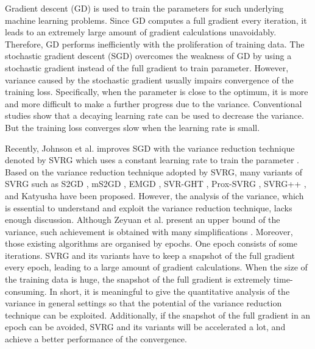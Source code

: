 \documentclass[letterpaper]{article}
\begin{document}
Gradient descent (GD) is used to train the parameters for such underlying machine learning problems. Since GD computes a full gradient every iteration, it leads to an extremely large amount of gradient calculations unavoidably.  Therefore, GD  performs inefficiently with the proliferation of training data. The stochastic gradient descent (SGD) overcomes the weakness of GD by using a stochastic gradient instead of the full gradient to train parameter. However, variance caused by the stochastic gradient usually impairs convergence of the training loss. Specifically, when the parameter is close to the optimum, it is more and more difficult to make a further progress  due to the variance. Conventional studies show that a decaying learning rate can be used to decrease the variance. But the training loss converges slow when the learning rate is small. 

Recently, Johnson et al. improves SGD with the variance reduction technique denoted by SVRG which uses a constant learning rate to train the parameter \cite{Johnson:9MAvkbgy}.  Based on the variance reduction technique adopted by SVRG, many variants of SVRG such as S2GD \cite{Richtarik:2013te}, mS2GD \cite{Liu:2015bx}, EMGD \cite{Zhang2013Linear}, SVR-GHT \cite{Li:2016vh}, Prox-SVRG \cite{Xiao:2014vw}, SVRG++ \cite{Allen2015Improved}, and Katyusha \cite{Allenzhu2016Katyusha} have been proposed. However, the analysis of the variance, which is essential to understand and exploit the variance reduction technique, lacks enough discussion. Although Zeyuan et al.  present an upper bound of the variance, such achievement is obtained with many  simplifications \cite{AllenZhu:2016up}. Moreover, those existing algorithms are organised by epochs. One epoch consists of some iterations. SVRG and its variants have to keep a snapshot of the full gradient every epoch, leading to a large amount of gradient calculations. When the size of the training data is huge, the snapshot of the full gradient is extremely time-consuming.   In short, it is meaningful to give the quantitative analysis  of the variance in general settings so that the potential of the variance reduction technique can be exploited.  Additionally, if the snapshot of the full gradient in an epoch can be avoided, SVRG and its variants will be accelerated a lot, and achieve a better performance of the convergence.
 
\end{document}
